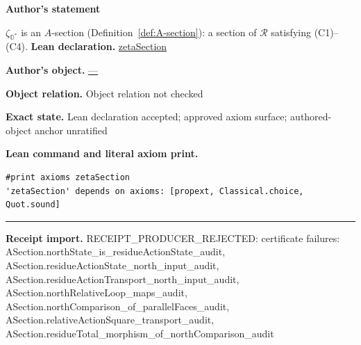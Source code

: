 \documentclass[11pt]{article}
\newcommand{\OO}{\mathbb{O}}
\newcommand{\Ostar}{\OO^{*}}
\newcommand{\zetaO}{\zeta_{\Ostar}}
\theoremstyle{plain}
\theoremstyle{definition}
\theoremstyle{remark}
\begin{document}
\begin{tcolorbox}[provenancecard,title={49. Corollary - \$\textbackslash{}zetaO\$ is an \$A\$-section},title after break={49. Corollary - \$\textbackslash{}zetaO\$ is an \$A\$-section (continued)}]
\textbf{Author's statement}\par
$\zetaO$ is an $A$-section \textup{(Definition~\ref{def:A-section})}: a section of
$\mathcal R$ satisfying \textup{(C1)--(C4)}.
\tcblower
\textbf{Lean declaration.} \url{zetaSection}
\par\textbf{Author's object.} \url{—}
\par\textbf{Object relation.} Object relation not checked
\par\textbf{Exact state.} Lean declaration accepted; approved axiom surface; authored-object anchor unratified
\par\smallskip\textbf{Lean command and literal axiom print.}
\begin{Verbatim}[breaklines=true,breakanywhere=true,fontsize=\small]
#print axioms zetaSection
'zetaSection' depends on axioms: [propext, Classical.choice, Quot.sound]
\end{Verbatim}
\medskip\hrule\medskip
\textbf{Receipt import.} \textcolor{KgtRed}{RECEIPT\_PRODUCER\_REJECTED: certificate failures: ASection.northState\_is\_residueActionState\_audit, ASection.residueActionState\_north\_input\_audit, ASection.residueActionTransport\_north\_input\_audit, ASection.northRelativeLoop\_maps\_audit, ASection.northComparison\_of\_parallelFaces\_audit, ASection.relativeActionSquare\_transport\_audit, ASection.residueTotal\_morphism\_of\_northComparison\_audit}
\end{tcolorbox}
\medskip
\end{document}
